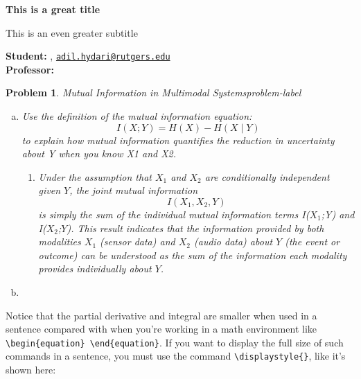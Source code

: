 


\newtheorem{problem}{Problem}


	
	\begin{Large}
		\textsf{\textbf{This is a great title}}
		
		This is an even greater subtitle
	\end{Large}
	
	\vspace{1ex}
	
	\textsf{\textbf{Student:}} , \href{mailto:adil.hydari@rutgers.edu}{\texttt{adil.hydari@rutgers.edu}}\\
	\textsf{\textbf{Professor:}} 
	
	
	\vspace{2ex}
	
	\begin{problem}{Mutual Information in Multimodal Systems}{problem-label}
		\begin{enumerate}[(a)]
			\item Use the definition of the mutual information equation:
			\[
			I(X;Y) = H(X) - H(X \mid Y)
			\]
			to explain how mutual information quantifies the reduction in uncertainty about Y when you know X1 and X2.
			\begin{enumerate}[label = (\roman*)]
				\item Under the assumption that $X_1$ and $X_2$ are conditionally independent given $Y$, the joint mutual information \[ I(X_1,X_2,Y) \] is simply the sum of the individual mutual information terms I($X_1$;Y) and I($X_2$;$Y$). This result indicates that the information provided by both modalities $X_1$ (sensor data) and $X_2$ (audio data) about $Y$ (the event or outcome) can be understood as the sum of the information each modality provides individually about $Y$.
			\end{enumerate}
			
			\item 
		\end{enumerate}
	\end{problem}
	
	Notice that the partial derivative and integral are smaller when used in a sentence compared with when you're working in a math environment like \verb|\begin{equation} \end{equation}|. If you want to display the full size of such commands in a sentence, you must use the command \verb|\displaystyle{}|, like it's shown here:
	
